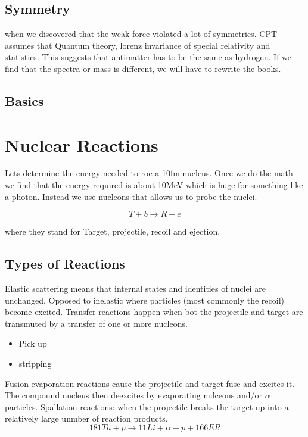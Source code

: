 \documentclass[english, 11pt]{article}
\begin{document}
\subsection{Symmetry} %
\label{sub:symmetry}

when we discovered that the weak force violated a lot of symmetries. CPT assumes that Quantum theory, lorenz invariance of special relativity and statistics. This suggests that antimatter has to be the same as hydrogen. If we find that the spectra or mass is different, we will have to rewrite the books.


\subsection{Basics} %
\label{sub:basics}

\section{Nuclear Reactions}

Lets determine the energy needed to roe a 10fm nucleus. Once we do the math we find that the energy required is about 10MeV which is huge for something like a photon. Instead we use nucleons that allows us to probe the nuclei.

\[ T + b \rightarrow R + e\]

where they stand for Target, projectile, recoil and ejection.

\subsection{Types of Reactions}

Elastic scattering means that internal states and identities of nuclei are unchanged.
Opposed to inelastic where particles (most commonly the recoil) become excited.
Transfer reactions happen when bot the projectile and target are transmuted by a transfer of one or more nucleons.
\begin{itemize}
    \item Pick up
    \item stripping
\end{itemize}
Fusion evaporation reactions cause the projectile and target fuse and excites it. The compound nucleus then deexcites by evaporating nulceons and/or $\alpha$ particles.
Spallation reactions: when the projectile breaks the target up into a relatively large unmber of reaction products.
\[181Ta + p \rightarrow 11Li + \alpha + p + 166ER\]
\end{document}
